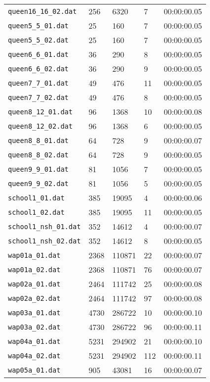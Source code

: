 \documentclass{article}
\begin{document}
\begin{table}
\begin{tabular}{y{3.6cm}x{1cm}x{1.5cm}x{1.5cm}y{1.5cm}}
    \verb|queen16_16_02.dat| & 256 & 6320 & 7 & 00:00:00.05 \\
    \verb|queen5_5_01.dat| & 25 & 160 & 7 & 00:00:00.05 \\
    \verb|queen5_5_02.dat| & 25 & 160 & 7 & 00:00:00.05 \\
    \verb|queen6_6_01.dat| & 36 & 290 & 8 & 00:00:00.05 \\
    \verb|queen6_6_02.dat| & 36 & 290 & 9 & 00:00:00.05 \\
    \verb|queen7_7_01.dat| & 49 & 476 & 11 & 00:00:00.05 \\
    \verb|queen7_7_02.dat| & 49 & 476 & 8 & 00:00:00.05 \\
    \verb|queen8_12_01.dat| & 96 & 1368 & 10 & 00:00:00.08 \\
    \verb|queen8_12_02.dat| & 96 & 1368 & 6 & 00:00:00.05 \\
    \verb|queen8_8_01.dat| & 64 & 728 & 9 & 00:00:00.07 \\
    \verb|queen8_8_02.dat| & 64 & 728 & 9 & 00:00:00.05 \\
    \verb|queen9_9_01.dat| & 81 & 1056 & 7 & 00:00:00.05 \\
    \verb|queen9_9_02.dat| & 81 & 1056 & 5 & 00:00:00.05 \\
    \verb|school1_01.dat| & 385 & 19095 & 4 & 00:00:00.06 \\
    \verb|school1_02.dat| & 385 & 19095 & 11 & 00:00:00.05 \\
    \verb|school1_nsh_01.dat| & 352 & 14612 & 4 & 00:00:00.07 \\
    \verb|school1_nsh_02.dat| & 352 & 14612 & 8 & 00:00:00.05 \\
    \verb|wap01a_01.dat| & 2368 & 110871 & 22 & 00:00:00.07 \\
    \verb|wap01a_02.dat| & 2368 & 110871 & 76 & 00:00:00.07 \\
    \verb|wap02a_01.dat| & 2464 & 111742 & 25 & 00:00:00.08 \\
    \verb|wap02a_02.dat| & 2464 & 111742 & 97 & 00:00:00.08 \\
    \verb|wap03a_01.dat| & 4730 & 286722 & 10 & 00:00:00.10 \\
    \verb|wap03a_02.dat| & 4730 & 286722 & 96 & 00:00:00.11 \\
    \verb|wap04a_01.dat| & 5231 & 294902 & 21 & 00:00:00.10 \\
    \verb|wap04a_02.dat| & 5231 & 294902 & 112 & 00:00:00.11 \\
    \verb|wap05a_01.dat| & 905 & 43081 & 16 & 00:00:00.07 \\

\end{tabular}
\end{table}
\end{document}
